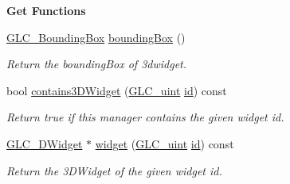\begin{Indent}{\bf Get Functions}\par
\begin{DoxyCompactItemize}
\item 
\hyperlink{class_g_l_c___bounding_box}{G\-L\-C\-\_\-\-Bounding\-Box} \hyperlink{class_g_l_c__3_d_widget_manager_ad5a031129fc0874837f2705521a449f8}{bounding\-Box} ()
\begin{DoxyCompactList}\small\item\em Return the bounding\-Box of 3dwidget. \end{DoxyCompactList}\item 
bool \hyperlink{class_g_l_c__3_d_widget_manager_aab6e6d1573845a433262d6bdfeba3cfd}{contains3\-D\-Widget} (\hyperlink{glc__global_8h_abf950976fabed69026558df8e2da6c6b}{G\-L\-C\-\_\-uint} \hyperlink{glext_8h_a58c2a664503e14ffb8f21012aabff3e9}{id}) const 
\begin{DoxyCompactList}\small\item\em Return true if this manager contains the given widget id. \end{DoxyCompactList}\item 
\hyperlink{class_g_l_c__3_d_widget}{G\-L\-C\-\_\-D\-Widget} $\ast$ \hyperlink{class_g_l_c__3_d_widget_manager_ada8f426c133cd59542dd975f418919a3}{widget} (\hyperlink{glc__global_8h_abf950976fabed69026558df8e2da6c6b}{G\-L\-C\-\_\-uint} \hyperlink{glext_8h_a58c2a664503e14ffb8f21012aabff3e9}{id}) const 
\begin{DoxyCompactList}\small\item\em Return the 3\-D\-Widget of the given widget id. \end{DoxyCompactList}\end{DoxyCompactItemize}
\end{Indent}

